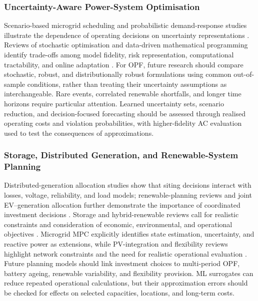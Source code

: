 \documentclass[a4paper,fleqn]{cas-sc}
\begin{document}
    \subsubsection{Uncertainty-Aware Power-System Optimisation}\label{subsubsec:gaps_uncertainty}
    
    Scenario-based microgrid scheduling and probabilistic demand-response studies illustrate the dependence of operating decisions on uncertainty representations \cite{opfRef018,opfRef036}. Reviews of stochastic optimisation and data-driven mathematical programming identify trade-offs among model fidelity, risk representation, computational tractability, and online adaptation \cite{opfRef076,opfRef059,roald2023power}. For OPF, future research should compare stochastic, robust, and distributionally robust formulations using common out-of-sample conditions, rather than treating their uncertainty assumptions as interchangeable. Rare events, correlated renewable shortfalls, and longer time horizons require particular attention. Learned uncertainty sets, scenario reduction, and decision-focused forecasting should be assessed through realised operating costs and violation probabilities, with higher-fidelity AC evaluation used to test the consequences of approximations.
    
    \subsubsection{Storage, Distributed Generation, and Renewable-System Planning}\label{subsubsec:gaps_storage_planning}
    
    Distributed-generation allocation studies show that siting decisions interact with losses, voltage, reliability, and load models; renewable-planning reviews and joint EV--generation allocation further demonstrate the importance of coordinated investment decisions \cite{opfRef009,opfRef013,opfRef021,opfRef038,opfRef040}. Storage and hybrid-renewable reviews call for realistic constraints and consideration of economic, environmental, and operational objectives \cite{opfRef079,opfRef083,worku2022recent,thirunavukkarasu2023comprehensive}. Microgrid MPC explicitly identifies state estimation, uncertainty, and reactive power as extensions, while PV-integration and flexibility reviews highlight network constraints and the need for realistic operational evaluation \cite{opfRef022,shafiullah2022grid,opfRef034}. Future planning models should link investment choices to multi-period OPF, battery ageing, renewable variability, and flexibility provision. ML surrogates can reduce repeated operational calculations, but their approximation errors should be checked for effects on selected capacities, locations, and long-term costs.
    
\end{document}
